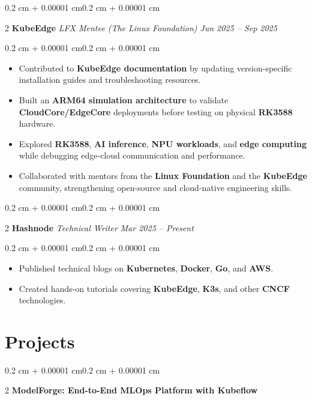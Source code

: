 \documentclass[10pt, letterpaper]{article}
\newenvironment{highlights}{\begin{itemize}[topsep=0.10 cm,parsep=0.10 cm,partopsep=0pt,itemsep=0pt,leftmargin=0.4 cm + 10pt]}{\end{itemize}}
\newenvironment{onecolentry}{\begin{adjustwidth}{0.2 cm + 0.00001 cm}{0.2 cm + 0.00001 cm}}{\end{adjustwidth}}
\newenvironment{twocolentry}[2][]{\onecolentry\def\secondColumn{#2}\setcolumnwidth{\fill, 4.5 cm}\begin{paracol}{2}}{\switchcolumn \raggedleft \secondColumn\end{paracol}\endonecolentry}
\let\hrefWithoutArrow\href
\renewcommand{\href}[2]{\hrefWithoutArrow{#1}{\ifthenelse{\equal{#2}{}}{ }{#2 }\raisebox{.15ex}{\footnotesize \faExternalLink*}}}
\begin{document}
\begin{twocolentry}{\textit{Jun 2025 -- Sep 2025}}
\textbf{KubeEdge}
\textit{\newline LFX Mentee (The Linux Foundation)}
\end{twocolentry}

\begin{onecolentry}
\begin{highlights}

\item Contributed to \textbf{KubeEdge documentation} by updating version-specific installation guides and troubleshooting resources.

\item Built an \textbf{ARM64 simulation architecture} to validate \textbf{CloudCore/EdgeCore} deployments before testing on physical \textbf{RK3588} hardware.

\item Explored \textbf{RK3588}, \textbf{AI inference}, \textbf{NPU workloads}, and \textbf{edge computing} while debugging edge-cloud communication and performance.

\item Collaborated with mentors from the \textbf{Linux Foundation} and the \textbf{KubeEdge} community, strengthening open-source and cloud-native engineering skills.

\end{highlights}
\end{onecolentry}

\begin{twocolentry}{\textit{Mar 2025 -- Present}}
\textbf{Hashnode}
\textit{\newline Technical Writer}
\end{twocolentry}

\begin{onecolentry}
\begin{highlights}

\item Published technical blogs on \textbf{Kubernetes}, \textbf{Docker}, \textbf{Go}, and \textbf{AWS}.

\item Created hands-on tutorials covering \textbf{KubeEdge}, \textbf{K3s}, and other \textbf{CNCF} technologies.

\end{highlights}
\end{onecolentry}




\section{Projects}
\begin{twocolentry}{\textit{\href{https://github.com/sachin21212121/ModelForge-Kubeflow-Project}{github}}}
\textbf{ModelForge: End-to-End MLOps Platform with Kubeflow}
\end{twocolentry}
\end{document}
